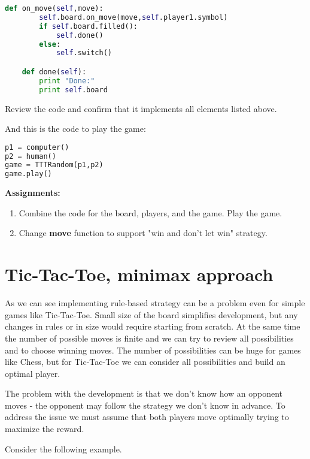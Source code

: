 \begin{lstlisting}[language=Python,style=codelst2,caption={Tic-Tac-Toe: the game - continued}]
    def on_move(self,move):
        self.board.on_move(move,self.player1.symbol)
        if self.board.filled():
            self.done()
        else:
            self.switch()

    def done(self):
        print "Done:"
        print self.board
\end{lstlisting}
Review the code and confirm that it implements all elements listed above.

And this is the code to play the game:

\begin{lstlisting}[language=Python,style=codelst2,caption={Tic-Tac-Toe: playing the game}]
p1 = computer()
p2 = human()
game = TTTRandom(p1,p2)
game.play()
\end{lstlisting}

\begin{tcolorbox}
\textbf{Assignments:}
\begin{enumerate}
\item Combine the code for the board, players, and the game. Play the game.
\item Change \textbf{move} function to support "win and don't let win"
strategy.
\end{enumerate}
\end{tcolorbox}


\section{Tic-Tac-Toe, minimax approach}

As we can see implementing rule-based strategy can be a problem
even for simple games like Tic-Tac-Toe. Small size of the board
simplifies development, but any changes in rules or in size
would require starting from scratch. At the same time the number
of possible moves is finite and we can try to review all possibilities
and to choose winning moves. The number of possibilities can be
huge for games like Chess, but for Tic-Tac-Toe we can consider
all possibilities and build an optimal player.

The problem with the development is that we don't know how an
opponent moves - the opponent may follow the strategy we don't know
in advance. To address the issue we must assume that both
players move optimally trying to maximize the reward.

Consider the following example.

